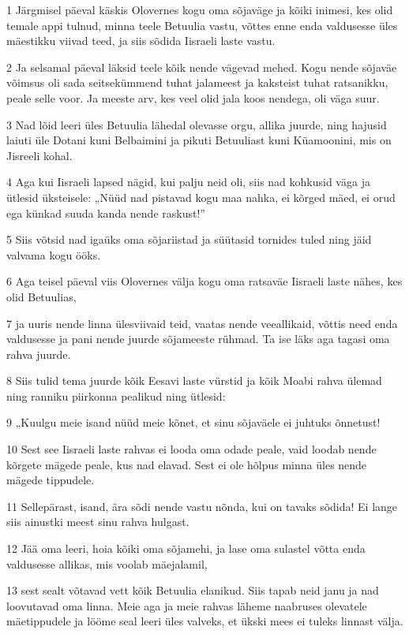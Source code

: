 \par 1 Järgmisel päeval käskis Olovernes kogu oma sõjaväge ja kõiki inimesi, kes olid temale appi tulnud, minna teele Betuulia vastu, võttes enne enda valdusesse üles mäestikku viivad teed, ja siis sõdida Iisraeli laste vastu.
\par 2 Ja selsamal päeval läksid teele kõik nende vägevad mehed. Kogu nende sõjaväe võimsus oli sada seitsekümmend tuhat jalameest ja kaksteist tuhat ratsanikku, peale selle voor. Ja meeste arv, kes veel olid jala koos nendega, oli väga suur.
\par 3 Nad lõid leeri üles Betuulia lähedal olevasse orgu, allika juurde, ning hajusid laiuti üle Dotani kuni Belbaimini ja pikuti Betuuliast kuni Küamoonini, mis on Jisreeli kohal.
\par 4 Aga kui Iisraeli lapsed nägid, kui palju neid oli, siis nad kohkusid väga ja ütlesid üksteisele: „Nüüd nad pistavad kogu maa nahka, ei kõrged mäed, ei orud ega künkad suuda kanda nende raskust!”
\par 5 Siis võtsid nad igaüks oma sõjariistad ja süütasid tornides tuled ning jäid valvama kogu ööks.
\par 6 Aga teisel päeval viis Olovernes välja kogu oma ratsaväe Iisraeli laste nähes, kes olid Betuulias,
\par 7 ja uuris nende linna ülesviivaid teid, vaatas nende veeallikaid, võttis need enda valdusesse ja pani nende juurde sõjameeste rühmad. Ta ise läks aga tagasi oma rahva juurde.
\par 8 Siis tulid tema juurde kõik Eesavi laste vürstid ja kõik Moabi rahva ülemad ning ranniku piirkonna pealikud ning ütlesid:
\par 9 „Kuulgu meie isand nüüd meie kõnet, et sinu sõjaväele ei juhtuks õnnetust!
\par 10 Sest see Iisraeli laste rahvas ei looda oma odade peale, vaid loodab nende kõrgete mägede peale, kus nad elavad. Sest ei ole hõlpus minna üles nende mägede tippudele.
\par 11 Sellepärast, isand, ära sõdi nende vastu nõnda, kui on tavaks sõdida! Ei lange siis ainustki meest sinu rahva hulgast.
\par 12 Jää oma leeri, hoia kõiki oma sõjamehi, ja lase oma sulastel võtta enda valdusesse allikas, mis voolab mäejalamil,
\par 13 sest sealt võtavad vett kõik Betuulia elanikud. Siis tapab neid janu ja nad loovutavad oma linna. Meie aga ja meie rahvas läheme naabruses olevatele mäetippudele ja lööme seal leeri üles valveks, et ükski mees ei tuleks linnast välja.
